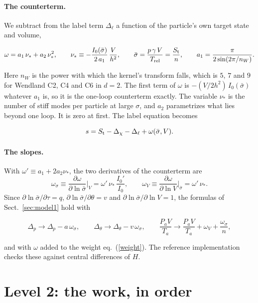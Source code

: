 \documentclass[11pt,aps,preprint,nofootinbib,superscriptaddress,tightenlines]{revtex4-2}
\def\st{\begin{equation}}
\def\stp{\end{equation}}
\def\Eq#1{eq.~(\ref{#1})}
\def\Sect#1{Sect.~\ref{#1}}
\let\oldparagraph\paragraph
\renewcommand{\paragraph}{\par\bigskip\oldparagraph}
\begin{document}
\paragraph{The counterterm.}  We subtract from the label term $\Delta_\ell$ a function of the particle's own target state and volume,
\begin{keyeq}
\st
\omega=a_1\,\nu_*+a_2\,\nu_*^2,\qquad
\nu_*\equiv-\frac{I_0(\bar\sigma)}{2\,a_1}\,\frac{V}{h^2},\qquad
\bar\sigma=\frac{p\,\gamma\,V}{T_{\rm rel}}=\frac{S_{\rm t}}n,\qquad a_1=\frac{\pi}{2\sin(2\pi/n_W)} .
\label{omega}
\stp
\end{keyeq}
Here $n_W$ is the power with which the kernel's transform falls, which is $5$, $7$ and $9$ for Wendland C2, C4 and C6 in $d=2$.  The first term of
$\omega$ is $-(V/2h^2)\,I_0(\bar\sigma)$ whatever $a_1$ is, so it is the one-loop counterterm exactly.  The variable $\nu_*$ is the number of stiff modes
per particle at large $\sigma$, and $a_2$ parametrizes what lies beyond one loop.  It is zero at first.  The label equation becomes
\begin{keyeq}
\st
s=S_{\rm t}-\Delta_\chi-\Delta_\ell+\omega(\bar\sigma,V) .
\label{label2}
\stp
\end{keyeq}

\paragraph{The slopes.}  With $\omega'\equiv a_1+2a_2\nu_*$, the two derivatives of the counterterm are
\st
\omega_\sigma\equiv\frac{\partial\omega}{\partial\ln\bar\sigma}\bigg|_V=\omega'\,\nu_*\,\frac{I_0'}{I_0},\qquad
\omega_V\equiv\frac{\partial\omega}{\partial\ln V}\bigg|_{\bar\sigma}=\omega'\,\nu_* .
\stp
Since $\partial\ln\bar\sigma/\partial\tau=q$, $\partial\ln\bar\sigma/\partial\theta=v$ and $\partial\ln\bar\sigma/\partial\ln V=1$, the formulas of
\Sect{sec:model1} hold with
\begin{keyeq}
\st
\Delta_p\to\Delta_p-a\,\omega_\sigma,\qquad \Delta_\theta\to\Delta_\theta-v\,\omega_\sigma,\qquad
\frac{P_aV}{T_a}\to\frac{P_aV}{T_a}+\omega_V+\frac{\omega_\sigma}n ,
\label{slopes2}
\stp
\end{keyeq}
and with $\omega$ added to the weight \Eq{weight}.  The reference implementation checks these against central differences of $H$.

\section{Level 2: the work, in order}
\label{sec:work2}
\end{document}
